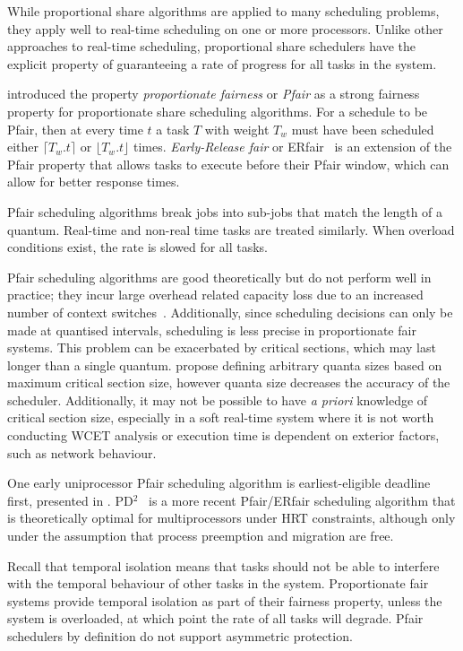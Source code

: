 While proportional share algorithms are applied to many scheduling problems, they apply
well to real-time scheduling on one or more processors.
Unlike other approaches to real-time scheduling, proportional share schedulers have the explicit property of guaranteeing a rate of progress for all tasks in the system.

\citet{Baruah_CPV_96} introduced the property \emph{proportionate fairness} or \emph{Pfair} as a
strong fairness property for proportionate share scheduling algorithms.  For a schedule to be Pfair,
then at every time $t$ a task $T$ with weight $T_{w}$ must have been scheduled either $\lceil T_{w}
. t \rceil$ or $\lfloor T_{w}.t \rfloor $ times.  \emph{Early-Release fair} or
ERfair~\citep{Anderson_Srinivasan_04} is an extension of the Pfair property that allows tasks to
execute before their Pfair window, which can allow for better response times.

Pfair scheduling algorithms break jobs into sub-jobs that match the length of a quantum.
Real-time and non-real time tasks are treated similarly.
When overload conditions exist, the rate is slowed for all tasks.

Pfair scheduling algorithms are good theoretically but do not perform well in practice; they incur
large overhead related capacity loss due to an increased number of context
switches~\citep{Abeni_Buttazzo_04}. Additionally, since
scheduling decisions can only be made at quantised intervals, scheduling is less precise in
proportionate fair systems.  This problem can be exacerbated by critical sections, which may last
longer than a single quantum.  \citet{Stoica_AKBGP_96} propose defining arbitrary quanta sizes based
on maximum critical section size, however quanta size decreases the accuracy of the scheduler.
Additionally, it may not be possible to have \emph{a priori} knowledge of critical section size, especially
in a soft real-time system where it is not worth conducting \gls{WCET} analysis or execution time
is dependent on exterior factors, such as network behaviour.

One early uniprocessor Pfair scheduling algorithm is earliest-eligible deadline first, presented in
\citet{Stoica_AKBGP_96}.  PD$^{2}$~\citep{Srinivasan_Anderson_06} is a more recent Pfair/ERfair
scheduling algorithm that is theoretically optimal for multiprocessors under \gls{HRT} constraints,
although only under the assumption that process preemption and migration are free.

Recall that temporal isolation means that tasks should not be able to interfere with the temporal
behaviour of other tasks in the system.  Proportionate fair systems provide temporal isolation as
part of their fairness property, unless the system is overloaded, at which point the rate of all
tasks will degrade. Pfair schedulers by definition do not support asymmetric protection.


